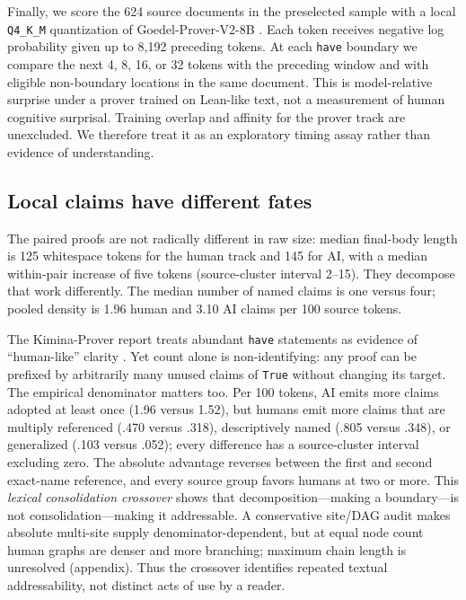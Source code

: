\documentclass[10pt]{article}
\newcommand{\code}[1]{\texttt{#1}}
\begin{document}
Finally, we score the 624 source documents in the preselected sample with a local \code{Q4\_K\_M}
quantization of Goedel-Prover-V2-8B \citep{lin2025goedel}.  Each token receives negative log
probability given up to 8,192 preceding tokens.  At each \code{have} boundary we compare the next
4, 8, 16, or 32 tokens with the preceding window and with eligible non-boundary locations in the
same document.  This is model-relative surprise under a prover trained on Lean-like text, not a
measurement of human cognitive surprisal.  Training overlap and affinity for the prover track are
unexcluded.  We therefore treat it as an exploratory timing assay rather than evidence of
understanding.

\subsection{Local claims have different fates}

The paired proofs are not radically different in raw size: median final-body length is 125
whitespace tokens for the human track and 145 for AI, with a median within-pair increase of five
tokens (source-cluster interval 2--15).  They decompose that work differently.  The median number
of named claims is one versus four; pooled density is 1.96 human and 3.10 AI claims per 100 source
tokens.

The Kimina-Prover report treats abundant \code{have} statements as evidence of ``human-like''
clarity \citep{kimina2025}.  Yet count alone is non-identifying: any proof can be prefixed by
arbitrarily many unused claims of \code{True} without changing its target.  The empirical denominator
matters too.  Per 100 tokens, AI emits more claims adopted at least once (1.96 versus 1.52), but
humans emit more claims that are multiply referenced (.470 versus .318), descriptively named (.805
versus .348), or generalized (.103 versus .052); every difference has a source-cluster interval
excluding zero.  The absolute advantage reverses between the first and second exact-name reference,
and every source group favors humans at two or more.  This \emph{lexical consolidation crossover}
shows that decomposition---making a boundary---is not consolidation---making it addressable.
A conservative site/DAG audit makes absolute multi-site supply denominator-dependent, but at equal node count
human graphs are denser and more branching; maximum chain length is unresolved (appendix).  Thus the
crossover identifies repeated textual addressability, not distinct acts of use by a reader.
\end{document}
